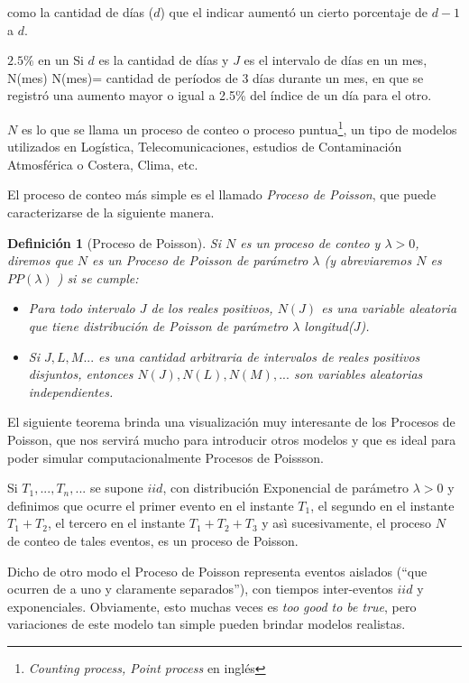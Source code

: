 \documentclass[
  oneside]{article}
\newtheorem{definition}{Definición}[section]
\begin{document}
como la cantidad de días (\(d\)) que el indicar aumentó un cierto
porcentaje de \(d-1\) a \(d\).

\(2.5\%\) en un Si \(d\) es la cantidad de días y \(J\) es el intervalo
de días en un mes, N(mes) N(mes)= cantidad de períodos de 3 días durante
un mes, en que se registró una aumento mayor o igual a 2.5\% del índice
de un día para el otro.

\(N\) es lo que se llama un proceso de conteo o proceso
puntua\footnote{\textit{Counting process, Point process} en inglés}, un
tipo de modelos utilizados en Logística, Telecomunicaciones, estudios de
Contaminación Atmosférica o Costera, Clima, etc.

El proceso de conteo más simple es el llamado
\textit{Proceso de Poisson}, que puede caracterizarse de la siguiente
manera.

\begin{definition}[Proceso de Poisson]\label{def:1}
Si $N$ es un proceso de conteo y $\lambda>0$, diremos que $N$ es un Proceso de Poisson de parámetro $\lambda$ (y abreviaremos $N$ es $PP(\lambda)$ ) si se cumple:
\begin{itemize}
\item[a)] Para todo intervalo $J$ de los reales positivos, $N(J)$ es una variable aleatoria que tiene distribución de Poisson de parámetro $\lambda$ longitud($J$).
\item[b)] Si $J, L, M...$ es una cantidad arbitraria de intervalos de reales positivos \textit{disjuntos}, entonces $N(J), N(L), N(M),...$ son variables aleatorias independientes.
\end{itemize}
\end{definition}

El siguiente teorema brinda una visualización muy interesante de los
Procesos de Poisson, que nos servirá mucho para introducir otros modelos
y que es ideal para poder simular computacionalmente Procesos de
Poissson.

\begin{theorem}\label{thm:otra_vision}
Si $T_1,...,T_n,...$ se supone $iid$,  con distribución Exponencial de parámetro $\lambda>0$ y definimos que ocurre el primer evento en el instante $T_1$, el segundo en el instante $T_1+T_2$, el tercero en el instante $T_1+T_2+T_3$ y asì sucesivamente, el proceso $N$ de conteo de tales eventos, es un proceso de Poisson.
\end{theorem}

Dicho de otro modo el Proceso de Poisson representa eventos aislados
(``que ocurren de a uno y claramente separados''), con tiempos
inter-eventos \(iid\) y exponenciales. Obviamente, esto muchas veces es
\textit{too good to be true}, pero variaciones de este modelo tan simple
pueden brindar modelos realistas.
\end{document}
